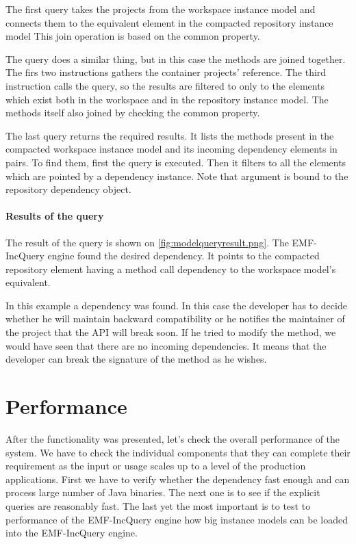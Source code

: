 The first  query takes the projects from the workspace
instance model and connects them to the equivalent element in the compacted
repository instance model This join operation is based on the common 
property.

The  query does a similar thing, but in this case the methods
are joined together. The firs two instructions gathers the container projects'
reference. The third instruction calls the  query, so the 
results are filtered to only to the elements which exist both in the workspace
and in the repository instance model. The methods itself also joined by 
checking the common  property.

The last  query returns the required results. It lists
the methods present in the compacted workspace instance model and its incoming
dependency elements in pairs. To find them, first the  query
is executed. Then it filters to all the elements which are pointed by a
dependency instance. Note that  argument is bound to the
repository dependency object.


\paragraph{Results of the query}
The result of the query is shown on \autoref{fig:modelqueryresult.png}.
The EMF-IncQuery engine found the desired dependency. It points to the compacted
repository element having a method call dependency to the workspace model's
equivalent.

In this example a dependency was found. In this case the developer 
has to decide whether he will maintain backward compatibility or he notifies the
maintainer of the  project that the API will break soon. If he tried
to modify the  method, we would have seen that there are no incoming
dependencies. It means that the developer can break the signature of the method as
he wishes. 

\section{Performance}
After the functionality was presented, let's check the overall performance of
the system. We have to check the individual components  that they can complete
their requirement as the input or usage scales up to a level of the production
applications. First we have to verify whether the dependency fast enough and can
process large number of Java binaries. The next one is to see if the explicit
queries are reasonably fast. The last yet the most important is to test to
performance of the EMF-IncQuery engine how big instance models can be loaded
into the EMF-IncQuery engine.

